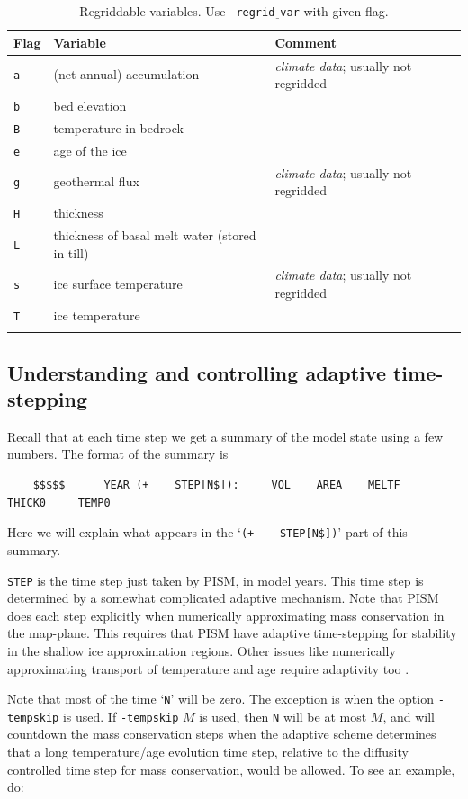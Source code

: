 \documentclass[11pt,final]{amsart}
\begin{document}
\begin{table}[h]
\caption{Regriddable variables.  Use \texttt{-regrid$\underline{\phantom{b}}$var} with given flag.}\label{tab:regridvar}
\begin{tabular}{@{}llll}\hline
\textbf{Flag} & \textbf{Variable} & \textbf{Comment}\\ \hline
\verb|a| & (net annual) accumulation & \emph{climate data}; usually not regridded \\
\verb|b| & bed elevation & \\
\verb|B| & temperature in bedrock & \\
\verb|e| & age of the ice & \\
\verb|g| & geothermal flux & \emph{climate data}; usually not regridded \\
\verb|H| & thickness & \\
\verb|L| & thickness of basal melt water (stored in till) & \\
\verb|s| & ice surface temperature & \emph{climate data}; usually not regridded\\
\verb|T| & ice temperature & \\
\hline
\normalsize
\end{tabular}
\end{table}


\subsection{Understanding and controlling adaptive time-stepping}  Recall that at each time step we get a summary of the model state using a few numbers.  The format of the summary is
\begin{verbatim}
    $$$$$      YEAR (+    STEP[N$]):     VOL    AREA    MELTF     THICK0     TEMP0
\end{verbatim}
Here we will explain what appears in the `\verb|(+    STEP[N$])|' part of this summary.

\verb|STEP| is the time step just taken by PISM, in model years.  This time step is determined by a somewhat complicated adaptive mechanism.  Note that PISM does each step explicitly when numerically approximating mass conservation in the map-plane.  This requires that PISM have adaptive time-stepping for stability in the shallow ice approximation regions.  Other issues like numerically approximating transport of temperature and age require adaptivity too \cite{BBL}.

Note that most of the time `\verb|N|' will be zero.  The exception is when the option \verb|-tempskip| is used.  If \verb|-tempskip| $M$ is used, then \verb|N| will be at most $M$, and will countdown the mass conservation steps when the adaptive scheme determines that a long temperature/age evolution time step, relative to the diffusity controlled time step for mass conservation, would be allowed.  To see an example, do: 
\end{document}
